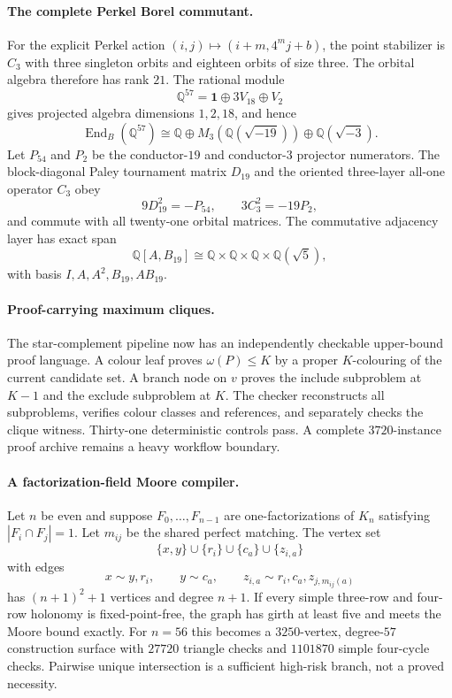 \paragraph{The complete Perkel Borel commutant.}
For the explicit Perkel action $(i,j)\mapsto(i+m,4^m j+b)$, the point stabilizer is $C_3$ with three singleton orbits and eighteen orbits of size three.  The orbital algebra therefore has rank $21$.  The rational module
\[
\mathbb Q^{57}=\mathbf 1\oplus 3V_{18}\oplus V_2
\]
gives projected algebra dimensions $1,2,18$, and hence
\[
\operatorname{End}_{B}(\mathbb Q^{57})
\cong
\mathbb Q\oplus M_3\!\left(\mathbb Q(\sqrt{-19})\right)
\oplus \mathbb Q(\sqrt{-3}).
\]
Let $P_{54}$ and $P_2$ be the conductor-$19$ and conductor-$3$ projector numerators.  The block-diagonal Paley tournament matrix $D_{19}$ and the oriented three-layer all-one operator $C_3$ obey
\[
9D_{19}^2=-P_{54},
\qquad
3C_3^2=-19P_2,
\]
and commute with all twenty-one orbital matrices.  The commutative adjacency layer has exact span
\[
\mathbb Q[A,B_{19}]
\cong
\mathbb Q\times\mathbb Q\times\mathbb Q\times\mathbb Q(\sqrt5),
\]
with basis $I,A,A^2,B_{19},AB_{19}$.

\paragraph{Proof-carrying maximum cliques.}
The star-complement pipeline now has an independently checkable upper-bound proof language.  A colour leaf proves $\omega(P)\le K$ by a proper $K$-colouring of the current candidate set.  A branch node on $v$ proves the include subproblem at $K-1$ and the exclude subproblem at $K$.  The checker reconstructs all subproblems, verifies colour classes and references, and separately checks the clique witness.  Thirty-one deterministic controls pass.  A complete $3720$-instance proof archive remains a heavy workflow boundary.

\paragraph{A factorization-field Moore compiler.}
Let $n$ be even and suppose $F_0,\dots,F_{n-1}$ are one-factorizations of $K_n$ satisfying $|F_i\cap F_j|=1$.  Let $m_{ij}$ be the shared perfect matching.  The vertex set
\[
\{x,y\}\cup\{r_i\}\cup\{c_a\}\cup\{z_{i,a}\}
\]
with edges
\[
x\sim y,r_i,
\qquad y\sim c_a,
\qquad z_{i,a}\sim r_i,c_a,z_{j,m_{ij}(a)}
\]
has $(n+1)^2+1$ vertices and degree $n+1$.  If every simple three-row and four-row holonomy is fixed-point-free, the graph has girth at least five and meets the Moore bound exactly.  For $n=56$ this becomes a $3250$-vertex, degree-$57$ construction surface with $27720$ triangle checks and $1101870$ simple four-cycle checks.  Pairwise unique intersection is a sufficient high-risk branch, not a proved necessity.

